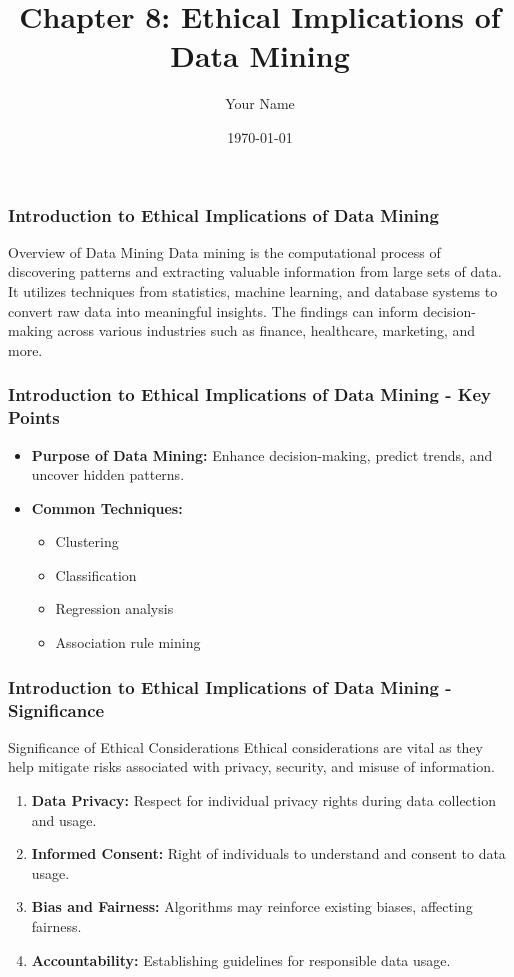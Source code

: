 \documentclass{beamer}
\title{Chapter 8: Ethical Implications of Data Mining}
\author{Your Name}
\institute{Your Institution}
\date{\today}
\begin{document}
\frame{\titlepage}

\begin{frame}[fragile]
    \frametitle{Introduction to Ethical Implications of Data Mining}
    \begin{block}{Overview of Data Mining}
        Data mining is the computational process of discovering patterns and extracting valuable information from large sets of data. It utilizes techniques from statistics, machine learning, and database systems to convert raw data into meaningful insights. The findings can inform decision-making across various industries such as finance, healthcare, marketing, and more.
    \end{block}
\end{frame}

\begin{frame}[fragile]
    \frametitle{Introduction to Ethical Implications of Data Mining - Key Points}
    \begin{itemize}
        \item \textbf{Purpose of Data Mining:} Enhance decision-making, predict trends, and uncover hidden patterns.
        \item \textbf{Common Techniques:} 
            \begin{itemize}
                \item Clustering
                \item Classification
                \item Regression analysis
                \item Association rule mining
            \end{itemize}
    \end{itemize}
\end{frame}

\begin{frame}[fragile]
    \frametitle{Introduction to Ethical Implications of Data Mining - Significance}
    \begin{block}{Significance of Ethical Considerations}
        Ethical considerations are vital as they help mitigate risks associated with privacy, security, and misuse of information.
    \end{block}
    \begin{enumerate}
        \item \textbf{Data Privacy:} Respect for individual privacy rights during data collection and usage.
        \item \textbf{Informed Consent:} Right of individuals to understand and consent to data usage.
        \item \textbf{Bias and Fairness:} Algorithms may reinforce existing biases, affecting fairness.
        \item \textbf{Accountability:} Establishing guidelines for responsible data usage.
    \end{enumerate}
\end{frame}
\end{document}
